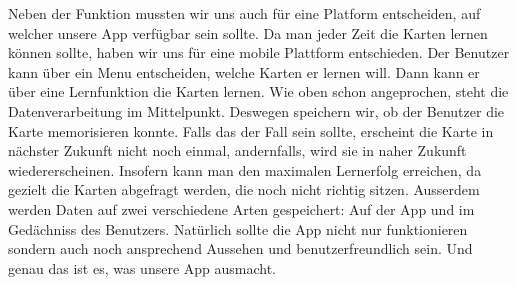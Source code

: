 Neben der Funktion mussten wir uns auch für eine Platform entscheiden, auf welcher unsere App verfügbar sein sollte. Da man jeder Zeit die Karten lernen können sollte, haben wir uns für eine mobile Plattform entschieden. Der Benutzer kann über ein Menu entscheiden, welche Karten er lernen will. Dann kann er über eine Lernfunktion die Karten lernen. Wie oben schon angeprochen, steht die Datenverarbeitung im Mittelpunkt. Deswegen speichern wir, ob der Benutzer die Karte memorisieren konnte. Falls das der Fall sein sollte, erscheint die Karte in nächster Zukunft nicht noch einmal, andernfalls, wird sie in naher Zukunft wiedererscheinen. Insofern kann man den maximalen Lernerfolg erreichen, da gezielt die Karten abgefragt werden, die noch nicht richtig sitzen. Ausserdem werden Daten auf zwei verschiedene Arten gespeichert: Auf der App  und im Gedächniss des Benutzers. Natürlich sollte die App nicht nur funktionieren sondern auch noch ansprechend Aussehen und benutzerfreundlich sein. Und genau das ist es, was unsere App ausmacht.